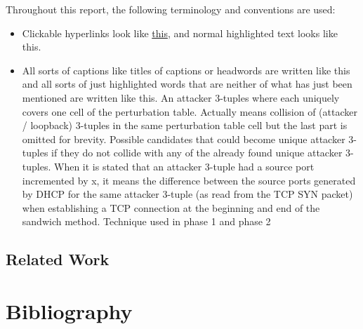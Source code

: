 \documentclass{report}
\begin{document}
Throughout this report, the following terminology and conventions are used:
\begin{itemize}
	\item Clickable hyperlinks look like \hyperref[sec:terminology and conventions]{this}, and normal highlighted text looks like \alert{this}.
  \item All sorts of captions like titles of captions or headwords are written like this  and all sorts of just highlighted words that are neither of what has just been mentioned are written like \alert{this}.
	 An attacker 3-tuples where each uniquely covers one cell of the perturbation table.
	 Actually means collision of (attacker / loopback) 3-tuples in the same perturbation table cell but the last part is omitted for brevity.
	 Possible candidates that could become unique attacker 3-tuples if they do not collide with any of the already found unique attacker 3-tuples.
	 When it is stated that an attacker 3-tuple had a source port incremented by x, it means the difference between the source ports generated by DHCP for the same attacker 3-tuple (as read from the TCP SYN packet) when establishing a TCP connection at the beginning and end of the sandwich method.
	 Technique used in phase 1 and phase 2 
\end{itemize}

\section{Related Work}
\label{sec:related work}

\vspace{0.5cm}
\chapter{Bibliography}
\label{sec:bibliography}

\printbibliography[heading=none]

\end{document}
